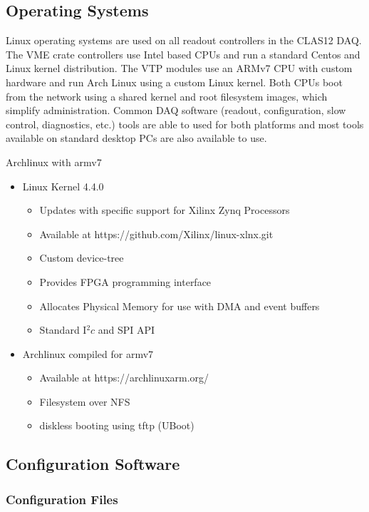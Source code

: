 \subsection{Operating Systems}

Linux operating systems are used on all readout controllers in the CLAS12 DAQ. The VME crate controllers use Intel based CPUs and run a standard Centos and Linux kernel distribution. The VTP modules use an ARMv7 CPU with custom hardware and run Arch Linux using a custom Linux kernel. Both CPUs boot from the network using a shared kernel and root filesystem images, which simplify administration. Common DAQ software (readout, configuration, slow control, diagnostics, etc.) tools are able to used for both platforms and most tools available on standard desktop PCs are also available to use.

Archlinux with armv7

\begin{itemize}
\item Linux Kernel 4.4.0
  \begin{itemize}
  \item Updates with specific support for Xilinx Zynq Processors
  \item Available at https://github.com/Xilinx/linux-xlnx.git
  \item Custom device-tree
  \item Provides FPGA programming interface
  \item Allocates Physical Memory for use with DMA and event buffers
  \item Standard I$^2c$ and SPI API
  \end{itemize}

\item Archlinux compiled for armv7
  \begin{itemize}
  \item Available at https://archlinuxarm.org/
  \item Filesystem over NFS
  \item diskless booting using tftp (UBoot)
  \end{itemize}
\end{itemize}


\subsection{Configuration Software}

\subsubsection{Configuration Files}

